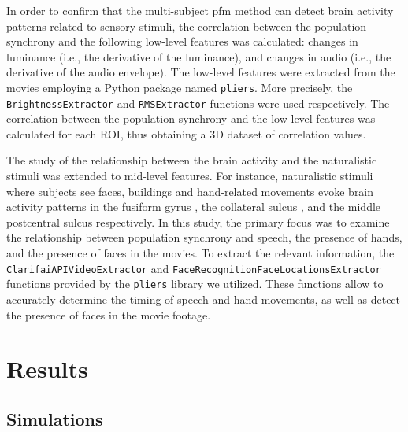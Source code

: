 In order to confirm that the multi-subject \acrlong*{pfm} method can detect
brain activity patterns related to sensory stimuli, the correlation between the
population synchrony and the following low-level features was calculated:
changes in luminance (i.e., the derivative of the luminance), and changes in
audio (i.e., the derivative of the audio envelope). The low-level features were
extracted from the movies employing a Python package named \texttt{pliers}. More
precisely, the \texttt{BrightnessExtractor} and \texttt{RMSExtractor} functions
were used respectively. The correlation between the population synchrony and the
low-level features was calculated for each ROI, thus obtaining a 3D dataset of
correlation values.

The study of the relationship between the brain activity and the naturalistic
stimuli was extended to mid-level features. For instance, naturalistic stimuli
where subjects see faces, buildings and hand-related movements evoke brain
activity patterns in the fusiform gyrus
\citep{Epstein1998corticalrepresentationlocal, Haxby2000distributedhumanneural},
the collateral sulcus \citep{Aguirre1998AreaHumanVentral,
Epstein1998corticalrepresentationlocal}, and the middle postcentral sulcus
\citep{Hasson2004IntersubjectSynchronizationCortical} respectively. In this
study, the primary focus was to examine the relationship between population
synchrony and speech, the presence of hands, and the presence of faces in the
movies. To extract the relevant information, the
\texttt{ClarifaiAPIVideoExtractor} and
\texttt{FaceRecognitionFaceLocationsExtractor} functions provided by the
\texttt{pliers} library we utilized. These functions allow to accurately
determine the timing of speech and hand movements, as well as detect the
presence of faces in the movie footage.

\section{Results}
\label{sec:multi_subject_results}

\subsection{Simulations}


